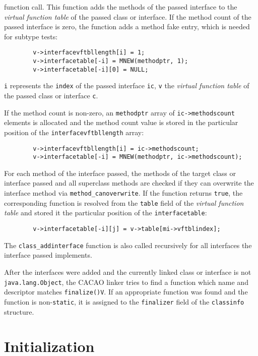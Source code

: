 function call. This function adds the methods of the passed interface
to the \textit{virtual function table} of the passed class or
interface. If the method count of the passed interface is zero, the
function adds a method fake entry, which is needed for subtype
tests:

\begin{verbatim}
        v->interfacevftbllength[i] = 1;
        v->interfacetable[-i] = MNEW(methodptr, 1);
        v->interfacetable[-i][0] = NULL;
\end{verbatim}

\texttt{i} represents the \texttt{index} of the passed interface
\texttt{ic}, \texttt{v} the \textit{virtual function table} of the
passed class or interface \texttt{c}.

If the method count is non-zero, an \texttt{methodptr} array of
\texttt{ic->methodscount} elements is allocated and the method count
value is stored in the particular position of the
\texttt{interfacevftbllength} array:

\begin{verbatim}
        v->interfacevftbllength[i] = ic->methodscount;
        v->interfacetable[-i] = MNEW(methodptr, ic->methodscount);
\end{verbatim}

For each method of the interface passed, the methods of the target
class or interface passed and all superclass methods are checked if
they can overwrite the interface method via
\texttt{method\_canoverwrite}. If the function returns \texttt{true},
the corresponding function is resolved from the
\texttt{table} field of the \textit{virtual function table} and stored
it the particular position of the \texttt{interfacetable}:

\begin{verbatim}
        v->interfacetable[-i][j] = v->table[mi->vftblindex];
\end{verbatim}

The \texttt{class\_addinterface} function is also called recursively
for all interfaces the interface passed implements.

After the interfaces were added and the currently linked class or
interface is not \texttt{java.lang.Object}, the CACAO linker tries to
find a function which name and descriptor matches
\texttt{finalize()V}. If an appropriate function was found and the
function is non-\texttt{static}, it is assigned to the
\texttt{finalizer} field of the \texttt{classinfo} structure.


\section{Initialization}
